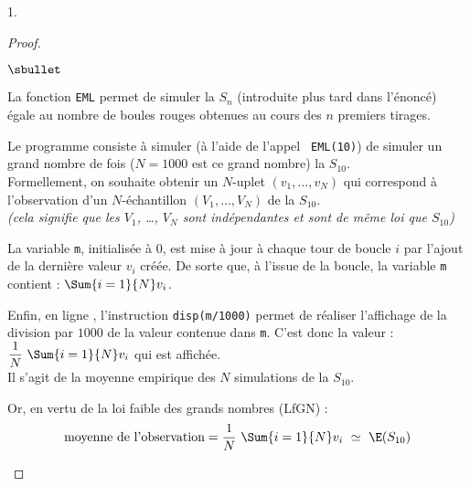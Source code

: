 \documentclass[11pt]{article}%
\begin{document}
\begin{noliste}{1.}
  \begin{proof}~
    \begin{noliste}{$\sbullet$}
    \item La fonction {\tt EML} permet de simuler la \var $S_n$
      (introduite plus tard dans l'énoncé) égale au nombre de boules
      rouges obtenues au cours des $n$ premiers tirages.

    \item Le programme consiste à simuler (à l'aide de l'appel {\tt
        EML(10)}) de simuler un grand nombre de fois ($N = 1000$ est
      ce grand nombre) la \var $S_{10}$.\\
      Formellement, on souhaite obtenir un $N$-uplet $(v_1, \ldots,
      v_{N})$ qui correspond à l'observation d'un $N$-échantillon
      $(V_1, \ldots, V_{N})$ de la \var $S_{10}$.\\
      {\it (cela signifie que les \var $V_1$, \ldots, $V_{N}$ sont
        indépendantes et sont de même loi que $S_{10}$)}

    \item La variable {\tt m}, initialisée à $0$, est mise à jour à
      chaque tour de boucle $i$ par l'ajout de la dernière valeur
      $v_i$ créée. De sorte que, à l'issue de la boucle, la variable
      {\tt m} contient : $\Sum{i=1}{N} v_i$.

    \item Enfin, en ligne , l'instruction {\tt disp(m/1000)}
      permet de réaliser l'affichage de la division par $1000$ de la
      valeur contenue dans {\tt m}. C'est donc la valeur :
      $\dfrac{1}{N} \ \Sum{i=1}{N} v_i$ qui est affichée.\\
      Il s'agit de la moyenne empirique des $N$ simulations de la \var
      $S_{10}$.

    \item Or, en vertu de la loi faible des grands nombres (LfGN) :
        \[
        \mbox{moyenne de l'observation} = \dfrac{1}{N} \ \Sum{i =
          1}{N} v_i \ \simeq \ \E(S_{10})
        \]

    \end{noliste}



\end{proof}
\end{noliste}
\end{document}
